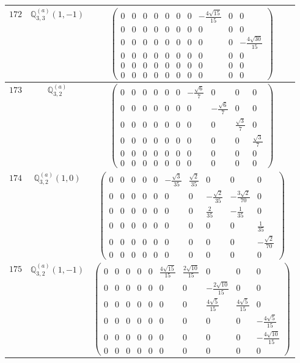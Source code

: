 \documentclass[fleqn,8pt,landscape]{jsarticle}
\begin{document}
\begin{center}
\begin{longtable}{ccc}
$ 172 $ & $ \mathbb{Q}_{3,3}^{(a)}(1,-1) $ & $ \begin{pmatrix} 0 & 0 & 0 & 0 & 0 & 0 & 0 & - \frac{4 \sqrt{15}}{15} & 0 & 0 \\ 0 & 0 & 0 & 0 & 0 & 0 & 0 & 0 & 0 & 0 \\ 0 & 0 & 0 & 0 & 0 & 0 & 0 & 0 & 0 & - \frac{4 \sqrt{30}}{15} \\ 0 & 0 & 0 & 0 & 0 & 0 & 0 & 0 & 0 & 0 \\ 0 & 0 & 0 & 0 & 0 & 0 & 0 & 0 & 0 & 0 \\ 0 & 0 & 0 & 0 & 0 & 0 & 0 & 0 & 0 & 0 \end{pmatrix} $ \\ \hline
$ 173 $ & $ \mathbb{Q}_{3,2}^{(a)} $ & $ \begin{pmatrix} 0 & 0 & 0 & 0 & 0 & 0 & - \frac{\sqrt{6}}{7} & 0 & 0 & 0 \\ 0 & 0 & 0 & 0 & 0 & 0 & 0 & - \frac{\sqrt{6}}{7} & 0 & 0 \\ 0 & 0 & 0 & 0 & 0 & 0 & 0 & 0 & \frac{\sqrt{3}}{7} & 0 \\ 0 & 0 & 0 & 0 & 0 & 0 & 0 & 0 & 0 & \frac{\sqrt{3}}{7} \\ 0 & 0 & 0 & 0 & 0 & 0 & 0 & 0 & 0 & 0 \\ 0 & 0 & 0 & 0 & 0 & 0 & 0 & 0 & 0 & 0 \end{pmatrix} $ \\ \hline
$ 174 $ & $ \mathbb{Q}_{3,2}^{(a)}(1,0) $ & $ \begin{pmatrix} 0 & 0 & 0 & 0 & 0 & - \frac{\sqrt{3}}{35} & \frac{\sqrt{2}}{35} & 0 & 0 & 0 \\ 0 & 0 & 0 & 0 & 0 & 0 & 0 & - \frac{\sqrt{2}}{35} & - \frac{3 \sqrt{2}}{70} & 0 \\ 0 & 0 & 0 & 0 & 0 & 0 & 0 & \frac{2}{35} & - \frac{1}{35} & 0 \\ 0 & 0 & 0 & 0 & 0 & 0 & 0 & 0 & 0 & \frac{1}{35} \\ 0 & 0 & 0 & 0 & 0 & 0 & 0 & 0 & 0 & - \frac{\sqrt{2}}{70} \\ 0 & 0 & 0 & 0 & 0 & 0 & 0 & 0 & 0 & 0 \end{pmatrix} $ \\ \hline
$ 175 $ & $ \mathbb{Q}_{3,2}^{(a)}(1,-1) $ & $ \begin{pmatrix} 0 & 0 & 0 & 0 & 0 & \frac{4 \sqrt{15}}{15} & \frac{2 \sqrt{10}}{15} & 0 & 0 & 0 \\ 0 & 0 & 0 & 0 & 0 & 0 & 0 & - \frac{2 \sqrt{10}}{15} & 0 & 0 \\ 0 & 0 & 0 & 0 & 0 & 0 & 0 & \frac{4 \sqrt{5}}{15} & \frac{4 \sqrt{5}}{15} & 0 \\ 0 & 0 & 0 & 0 & 0 & 0 & 0 & 0 & 0 & - \frac{4 \sqrt{5}}{15} \\ 0 & 0 & 0 & 0 & 0 & 0 & 0 & 0 & 0 & - \frac{4 \sqrt{10}}{15} \\ 0 & 0 & 0 & 0 & 0 & 0 & 0 & 0 & 0 & 0 \end{pmatrix} $ \\ \hline

\end{longtable}
\end{center}
\end{document}
